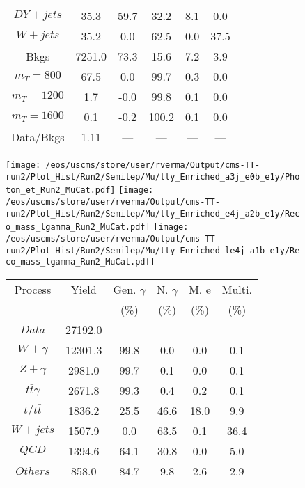 \begin{figure}
\begin{minipage}[c]{0.32\textwidth}
{\begin{tabular}{cccccc}
$ DY+jets $ &  35.3 &  59.7 &  32.2 &  8.1 &  0.0\\
$ W+jets $ &  35.2 &  0.0 &  62.5 &  0.0 &  37.5\\
Bkgs &  7251.0 &  73.3 &  15.6 &  7.2 &  3.9\\
$ m_{T} = 800 $ &  67.5 &  0.0 &  99.7 &  0.3 &  0.0\\
$ m_{T} = 1200 $ &  1.7 &  -0.0 &  99.8 &  0.1 &  0.0\\
$ m_{T} = 1600 $ &  0.1 &  -0.2 &  100.2 &  0.1 &  0.0\\
Data/Bkgs &  1.11 &  --- &  --- &  --- &  ---\\
\hline
\end{tabular}
}
\end{minipage}
\end{figure}

\begin{figure}
\centering
\texttt{[image: /eos/uscms/store/user/rverma/Output/cms-TT-run2/Plot\_Hist/Run2/Semilep/Mu/tty\_Enriched\_a3j\_e0b\_e1y/Photon\_et\_Run2\_MuCat.pdf]}
\texttt{[image: /eos/uscms/store/user/rverma/Output/cms-TT-run2/Plot\_Hist/Run2/Semilep/Mu/tty\_Enriched\_e4j\_a2b\_e1y/Reco\_mass\_lgamma\_Run2\_MuCat.pdf]}
\texttt{[image: /eos/uscms/store/user/rverma/Output/cms-TT-run2/Plot\_Hist/Run2/Semilep/Mu/tty\_Enriched\_le4j\_a1b\_e1y/Reco\_mass\_lgamma\_Run2\_MuCat.pdf]}
\begin{minipage}[c]{0.32\textwidth}
\centering
\tiny{
\begin{tabular}{cccccc}
\hline
Process & Yield & Gen. $\gamma$ & N. $\gamma$ & M. e & Multi. \\
 &  & (\%) & (\%) & (\%) & (\%)  \\
\hline
                                                                      $ Data $ &  27192.0 &  --- &  --- &  --- &  ---\\
$ W+\gamma $ &  12301.3 &  99.8 &  0.0 &  0.0 &  0.1\\
$ Z+\gamma $ &  2981.0 &  99.7 &  0.1 &  0.0 &  0.1\\
$ t\bar{t}\gamma $ &  2671.8 &  99.3 &  0.4 &  0.2 &  0.1\\
$ t/t\bar{t} $ &  1836.2 &  25.5 &  46.6 &  18.0 &  9.9\\
$ W+jets $ &  1507.9 &  0.0 &  63.5 &  0.1 &  36.4\\
$ QCD $ &  1394.6 &  64.1 &  30.8 &  0.0 &  5.0\\
$ Others $ &  858.0 &  84.7 &  9.8 &  2.6 &  2.9\\

\end{tabular}}
\end{minipage}
\end{figure}
